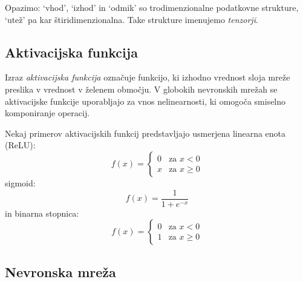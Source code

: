 \documentclass[a4paper,11pt]{article}
\begin{document}
Opazimo: `vhod', `izhod' in `odmik' so trodimenzionalne podatkovne strukture, `utež' pa kar štiridimenzionalna.
Take strukture imenujemo \emph{tenzorji}.

\subsection{Aktivacijska funkcija}

Izraz \emph{aktivacijska funkcija} označuje funkcijo, ki izhodno vrednost sloja mreže preslika v vrednost v želenem območju.\cite{activation_func_1}
V globokih nevronskih mrežah se aktivacijske funkcije uporabljajo za vnos nelinearnosti,
	ki omogoča smiselno komponiranje operacij.\cite{activation_func_2}

Nekaj primerov aktivacijskih funkcij predstavljajo usmerjena linearna enota (ReLU):
\begin{equation*} 
f(x) = \begin{cases}
	0 & \text{za } x < 0 \\
	x & \text{za } x \ge 0
\end{cases}
\end{equation*}
sigmoid:
\begin{equation*} 
f(x) = \frac{1}{1 + e^{-x}}
\end{equation*}
in binarna stopnica:
\begin{equation*} 
f(x) = \begin{cases}
	0 & \text{za } x < 0 \\
	1 & \text{za } x \ge 0
\end{cases}
\end{equation*}

\subsection{Nevronska mreža}
\end{document}
